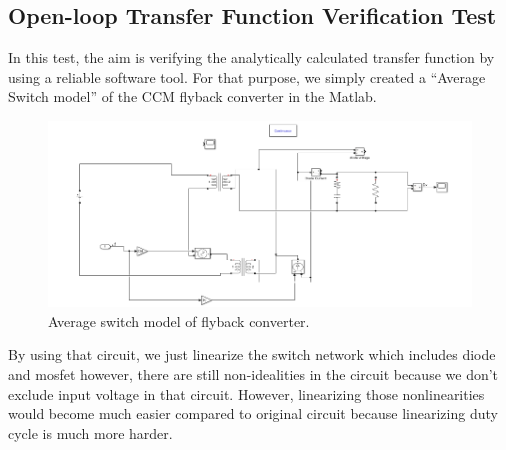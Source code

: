 \documentclass{article}
\begin{document}
\subsection{Open-loop Transfer Function Verification Test}
In this test, the aim is verifying the analytically calculated transfer function by using a reliable software tool. For that purpose, we simply created a “Average Switch model” of the CCM flyback converter in the Matlab.
\begin{figure}[H]
    \centering
    \includegraphics{s1.png}
    \caption{Average switch model of flyback converter.}
    \label{fig:my_label}
\end{figure}


	By using that circuit, we just linearize the switch network which includes diode and mosfet however, there are still non-idealities in the circuit because we don’t exclude input voltage in that circuit. However, linearizing those nonlinearities would become much easier compared to original circuit because linearizing duty cycle is much more harder. 
\end{document}
